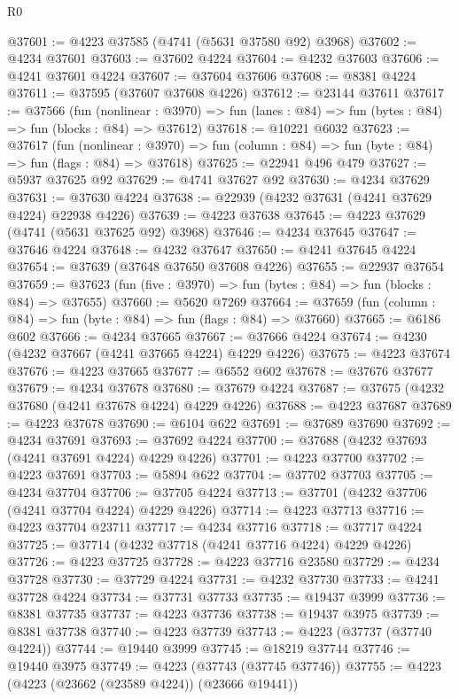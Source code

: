 \begin{lexlean}{R0}
\begin{coremodule}
@37601 := @4223 @37585 (@4741 (@5631 @37580 @92) @3968)
@37602 := @4234 @37601
@37603 := @37602 @4224
@37604 := @4232 @37603
@37606 := @4241 @37601 @4224
@37607 := @37604 @37606
@37608 := @8381 @4224
@37611 := @37595 (@37607 @37608 @4226)
@37612 := @23144 @37611
@37617 := @37566
    (fun (nonlinear : @3970) =>
    fun (lanes : @84) => fun (bytes : @84) => fun (blocks : @84) => @37612)
@37618 := @10221 @6032
@37623 := @37617
    (fun (nonlinear : @3970) =>
    fun (column : @84) => fun (byte : @84) => fun (flags : @84) => @37618)
@37625 := @22941 @496 @479
@37627 := @5937 @37625 @92
@37629 := @4741 @37627 @92
@37630 := @4234 @37629
@37631 := @37630 @4224
@37638 := @22939 (@4232 @37631 (@4241 @37629 @4224) @22938 @4226)
@37639 := @4223 @37638
@37645 := @4223 @37629 (@4741 (@5631 @37625 @92) @3968)
@37646 := @4234 @37645
@37647 := @37646 @4224
@37648 := @4232 @37647
@37650 := @4241 @37645 @4224
@37654 := @37639 (@37648 @37650 @37608 @4226)
@37655 := @22937 @37654
@37659 := @37623 (fun (five : @3970) => fun (bytes : @84) => fun (blocks : @84) => @37655)
@37660 := @5620 @7269
@37664 := @37659 (fun (column : @84) => fun (byte : @84) => fun (flags : @84) => @37660)
@37665 := @6186 @602
@37666 := @4234 @37665
@37667 := @37666 @4224
@37674 := @4230 (@4232 @37667 (@4241 @37665 @4224) @4229 @4226)
@37675 := @4223 @37674
@37676 := @4223 @37665
@37677 := @6552 @602
@37678 := @37676 @37677
@37679 := @4234 @37678
@37680 := @37679 @4224
@37687 := @37675 (@4232 @37680 (@4241 @37678 @4224) @4229 @4226)
@37688 := @4223 @37687
@37689 := @4223 @37678
@37690 := @6104 @622
@37691 := @37689 @37690
@37692 := @4234 @37691
@37693 := @37692 @4224
@37700 := @37688 (@4232 @37693 (@4241 @37691 @4224) @4229 @4226)
@37701 := @4223 @37700
@37702 := @4223 @37691
@37703 := @5894 @622
@37704 := @37702 @37703
@37705 := @4234 @37704
@37706 := @37705 @4224
@37713 := @37701 (@4232 @37706 (@4241 @37704 @4224) @4229 @4226)
@37714 := @4223 @37713
@37716 := @4223 @37704 @23711
@37717 := @4234 @37716
@37718 := @37717 @4224
@37725 := @37714 (@4232 @37718 (@4241 @37716 @4224) @4229 @4226)
@37726 := @4223 @37725
@37728 := @4223 @37716 @23580
@37729 := @4234 @37728
@37730 := @37729 @4224
@37731 := @4232 @37730
@37733 := @4241 @37728 @4224
@37734 := @37731 @37733
@37735 := @19437 @3999
@37736 := @8381 @37735
@37737 := @4223 @37736
@37738 := @19437 @3975
@37739 := @8381 @37738
@37740 := @4223 @37739
@37743 := @4223 (@37737 (@37740 @4224))
@37744 := @19440 @3999
@37745 := @18219 @37744
@37746 := @19440 @3975
@37749 := @4223 (@37743 (@37745 @37746))
@37755 := @4223 (@4223 (@23662 (@23589 @4224)) (@23666 @19441))

\end{coremodule}
\end{lexlean}

